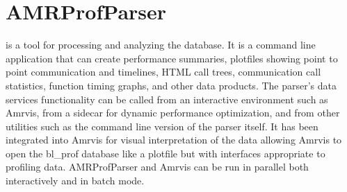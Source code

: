\documentclass[letterpaper,10pt,english]{sphinxmanual}
\begin{document}
\begin{sphinxVerbatim}[commandchars=\\\{\}]
\end{sphinxVerbatim}


\section{AMRProfParser}
\label{\detokenize{AMReX_Profiling_Tools:amrprofparser}}
\sphinxAtStartPar
{} is a tool for processing and analyzing the 
database. It is a command line application that can create performance
summaries, plotfiles showing point to point communication and timelines, HTML
call trees, communication call statistics, function timing graphs, and other
data products. The parser’s data services functionality can be called from an
interactive environment such as Amrvis, from a sidecar for dynamic performance
optimization, and from other utilities such as the command line version of the
parser itself. It has been integrated into Amrvis for visual interpretation of
the data allowing Amrvis to open the bl\_prof database like a plotfile but with
interfaces appropriate to profiling data. AMRProfParser and Amrvis can be run
in parallel both interactively and in batch mode.
\end{document}
